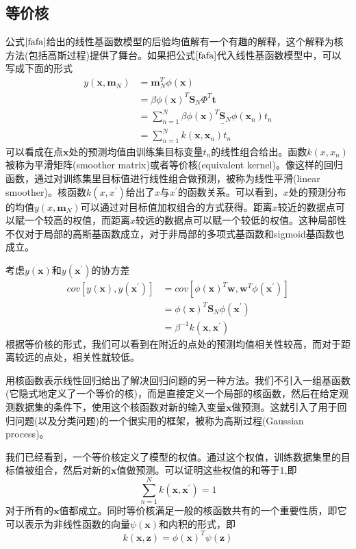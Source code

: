 \subsection*{等价核}
公式$\ref{fafa}$给出的线性基函数模型的后验均值解有一个有趣的解释，这个解释为核方法(包括高斯过程)提供了舞台。如果把公式$\ref{fafa}$代入线性基函数模型中，可以写成下面的形式
\begin{equation}
\begin{aligned}
	y(\boldsymbol{x},\boldsymbol{m}_N)&=\boldsymbol{m}_N^T\phi(\boldsymbol{x})\\
	&=\beta\phi(\boldsymbol{x})^T\boldsymbol{S}_N\Phi^T\boldsymbol{t}\\
	&=\sum_{n=1}^{N}\underline{\beta\phi(\boldsymbol{x})^T\boldsymbol{S}_N\phi(\boldsymbol{x}_n)}t_n\\
	&=\sum_{n=1}^{N}k(\boldsymbol{x},\boldsymbol{x}_n)t_n
\end{aligned}
\end{equation}
可以看成在点$\boldsymbol{x}$处的预测均值由训练集目标变量$t_n$的线性组合给出。函数$k(x,x_n)$被称为平滑矩阵(smoother matrix)或者等价核(equivalent kernel)。像这样的回归函数，通过对训练集里目标值进行线性组合做预测，被称为线性平滑(linear smoother)。核函数$k(x,x^{'})$给出了$x$与$x^{'}$的函数关系。可以看到，$x$处的预测分布的均值$y(x,\boldsymbol{m}_N)$可以通过对目标值加权组合的方式获得。距离$x$较近的数据点可以赋一个较高的权值，而距离$x$较远的数据点可以赋一个较低的权值。这种局部性不仅对于局部的高斯基函数成立，对于非局部的多项式基函数和sigmoid基函数也成立。

考虑$y(\boldsymbol{x})$和$y(\boldsymbol{x^{'}})$的协方差
\begin{equation}
	\begin{aligned}
	cov[y(\boldsymbol{x}),y(\boldsymbol{x^{'}})]&=cov[\phi(\boldsymbol{x})^T\boldsymbol{w},\boldsymbol{w}^T\phi(\boldsymbol{x^{'}})]\\
	&=\phi(\boldsymbol{x})^T\boldsymbol{S}_N\phi(\boldsymbol{x^{'}})\\
	&=\beta^{-1}k(\boldsymbol{x},\boldsymbol{x^{'}})
	\end{aligned}
\end{equation}
根据等价核的形式，我们可以看到在附近的点处的预测均值相关性较高，而对于距离较远的点处，相关性就较低。

用核函数表示线性回归给出了解决回归问题的另一种方法。我们不引入一组基函数(它隐式地定义了一个等价的核)，而是直接定义一个局部的核函数，然后在给定观测数据集的条件下，使用这个核函数对新的输入变量$\boldsymbol{x}$做预测。这就引入了用于回归问题(以及分类问题)的一个很实用的框架，被称为高斯过程(Gaussian process)。

我们已经看到，一个等价核定义了模型的权值。通过这个权值，训练数据集里的目标值被组合，然后对新的$\boldsymbol{x}$值做预测。可以证明这些权值的和等于1,即
\begin{equation}
	\sum_{n=1}^{N}k(\boldsymbol{x},\boldsymbol{x}^{'})=1
\end{equation}
对于所有的$\boldsymbol{x}$值都成立。同时等价核满足一般的核函数共有的一个重要性质，即它可以表示为非线性函数的向量$\psi(\boldsymbol{x})$和内积的形式，即
\begin{equation}
	k(\boldsymbol{x},\boldsymbol{z})=\phi(\boldsymbol{x})^T\psi(\boldsymbol{z})
\end{equation}